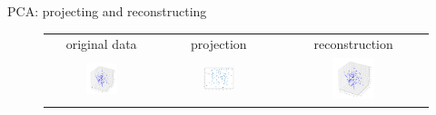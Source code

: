 \begin{frame}{PCA: projecting and reconstructing}
\begin{figure}
\begin{tabular}{ccc}
\small{original data} & \small{projection} & \small{reconstruction}\\
\includegraphics[width=0.3\textwidth]{img/pca/original.pdf}&
\includegraphics[width=0.3\textwidth]{img/pca/proj.pdf}&
\includegraphics[width=0.3\textwidth]{img/pca/reconstr.pdf}
\end{tabular}
\end{figure}
\end{frame}